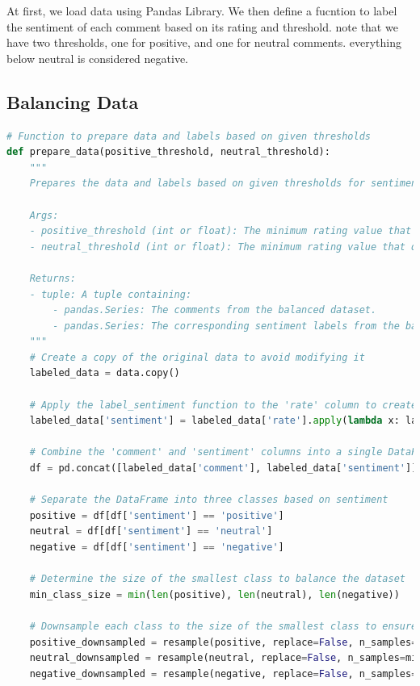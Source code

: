 \documentclass{solutionclass} %
\begin{document}
\begin{solution}
At first, we load data using Pandas Library. We then define a fucntion to label the sentiment of each comment based on its rating and threshold. note that we have two thresholds, one for positive, and one for neutral comments. everything below neutral is considered negative.
\end{solution}



\subsection*{Balancing Data}


\begin{lstlisting}[language=Python]
	# Function to prepare data and labels based on given thresholds
def prepare_data(positive_threshold, neutral_threshold):
    """
    Prepares the data and labels based on given thresholds for sentiment classification.

    Args:
    - positive_threshold (int or float): The minimum rating value that qualifies as 'positive'.
    - neutral_threshold (int or float): The minimum rating value that qualifies as 'neutral'; ratings below this are considered 'negative'.

    Returns:
    - tuple: A tuple containing:
        - pandas.Series: The comments from the balanced dataset.
        - pandas.Series: The corresponding sentiment labels from the balanced dataset.
    """
    # Create a copy of the original data to avoid modifying it
    labeled_data = data.copy()
    
    # Apply the label_sentiment function to the 'rate' column to create a new 'sentiment' column
    labeled_data['sentiment'] = labeled_data['rate'].apply(lambda x: label_sentiment(x, positive_threshold, neutral_threshold))
    
    # Combine the 'comment' and 'sentiment' columns into a single DataFrame
    df = pd.concat([labeled_data['comment'], labeled_data['sentiment']], axis=1)

    # Separate the DataFrame into three classes based on sentiment
    positive = df[df['sentiment'] == 'positive']
    neutral = df[df['sentiment'] == 'neutral']
    negative = df[df['sentiment'] == 'negative']

    # Determine the size of the smallest class to balance the dataset
    min_class_size = min(len(positive), len(neutral), len(negative))

    # Downsample each class to the size of the smallest class to ensure balance
    positive_downsampled = resample(positive, replace=False, n_samples=min_class_size, random_state=42)
    neutral_downsampled = resample(neutral, replace=False, n_samples=min_class_size, random_state=42)
    negative_downsampled = resample(negative, replace=False, n_samples=min_class_size, random_state=42)


\end{lstlisting}
\end{document}
